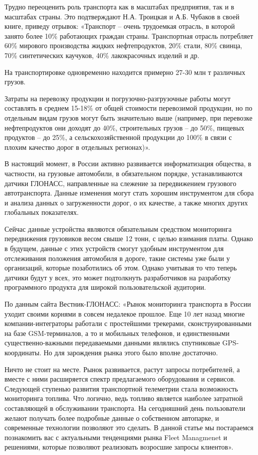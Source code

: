 Трудно переоценить роль транспорта как в масштабах предприятия, так и в
масштабах страны. Это подтверждают Н.А. Троицкая и А.Б. Чубаков в своей книге,
приведу отрывок: «Транспорт – очень трудоемкая отрасль, в которой занято более
10\% работающих граждан страны. Транспортная отрасль потребляет 60\% мирового
производства жидких нефтепродуктов, 20\% стали, 80\% свинца, 70\% синтетических
каучуков, 40\% лакокрасочных изделий и др.

На транспортировке одновременно находится примерно 27-30 млн т различных грузов.

Затраты на перевозку продукции и погрузочно-разгрузочные работы могут составлять
в среднем 15-18\% от общей стоимости перевозимой продукции, но по отдельным видам
грузов могут быть значительно выше (например, при перевозке нефтепродуктов они
доходят до 40\%, строительных грузов – до 50\%, пищевых продуктов – до 25\%, а
сельскохозяйственной продукции до 100\% в связи с плохим качество дорог в
отдельных регионах)».

В настоящий момент, в России активно развивается информатизация общества, в
частности, на грузовые автомобили, в обязательном порядке, устанавливаются
датчики ГЛОНАСС, направленные на слежение за передвижением грузового
автотранспорта. Данные изменения могут стать хорошим инструментом для сбора и
анализа данных о загруженности дорог, о их качестве, а также многих других
глобальных показателях.

Сейчас данные устройства являются обязательным средством мониторинга
передвижения грузовиков весом свыше 12 тонн, с целью взимания платы. Однако в
будущем, данные с этих устройств смогут удобным инструментом для отслеживания
положения автомобиля в дороге, такие  системы уже были у организаций, которые
позаботились об этом. Однако учитывая то что теперь датчики будут у всех, это
может подтолкнуть разработчиков на разработку программного продукта для широкой
пользовательской аудитории.

По данным сайта Вестник-ГЛОНАСС: «Рынок мониторинга транспорта в России уходит
своими корнями в совсем недалекое прошлое. Еще 10 лет назад многие
компании-интеграторы работали с простейшими трекерами, сконструированными на
базе GSM-терминалов, а то и мобильных телефонов, и единственными
существенно-важными передаваемыми данными являлись спутниковые GPS-координаты.
Но для зарождения рынка этого было вполне достаточно.

Ничто не стоит на месте. Рынок развивается, растут запросы потребителей, а
вместе с ними расширяется спектр предлагаемого оборудования и сервисов.
Следующей ступенью развития транспортной телеметрии стала возможность
мониторинга топлива. Что логично, ведь топливо является наиболее затратной
составляющей в обслуживании транспорта. На сегодняшний день пользователи желают
получать более подробные данные о собственном автопарке, и современные
технологии позволяют это сделать. В данной статье мы постараемся познакомить вас
с актуальными тенденциями рынка Fleet Managmenet и решениями, которые позволяют
реализовать возросшие запросы клиентов».

